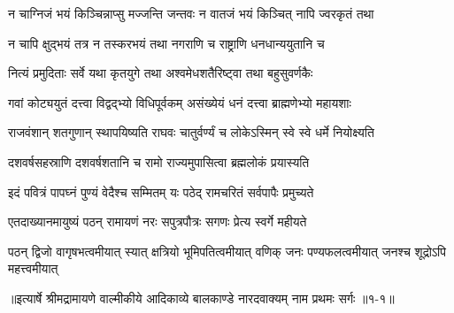 \twolineshloka
{न चाग्निजं भयं किञ्चिन्नाप्सु मज्जन्ति जन्तवः}
{न वातजं भयं किञ्चित् नापि ज्वरकृतं तथा} %

\twolineshloka
{न चापि क्षुद्भयं तत्र न तस्करभयं तथा}
{नगराणि च राष्ट्राणि धनधान्ययुतानि च} %

\twolineshloka
{नित्यं प्रमुदिताः सर्वे यथा कृतयुगे तथा}
{अश्वमेधशतैरिष्ट्वा तथा बहुसुवर्णकैः} %

\twolineshloka
{गवां कोट्ययुतं दत्त्वा विद्वद्भ्यो विधिपूर्वकम्}
{असंख्येयं धनं दत्त्वा ब्राह्मणेभ्यो महायशाः} %

\twolineshloka
{राजवंशान् शतगुणान् स्थापयिष्यति राघवः}
{चातुर्वर्ण्यं च लोकेऽस्मिन् स्वे स्वे धर्मे नियोक्ष्यति} %

\twolineshloka
{दशवर्षसहस्राणि दशवर्षशतानि च}
{रामो राज्यमुपासित्वा ब्रह्मलोकं प्रयास्यति} %

\twolineshloka
{इदं पवित्रं पापघ्नं पुण्यं वेदैश्च सम्मितम्}
{यः पठेद् रामचरितं सर्वपापैः प्रमुच्यते} %

\twolineshloka
{एतदाख्यानमायुष्यं पठन् रामायणं नरः}
{सपुत्रपौत्रः सगणः प्रेत्य स्वर्गे महीयते} %

\fourlineindentedshloka
{पठन् द्विजो वागृषभत्वमीयात्}
{स्यात् क्षत्रियो भूमिपतित्वमीयात्}
{वणिक् जनः पण्यफलत्वमीयात्}
{जनश्च शूद्रोऽपि महत्त्वमीयात्} %


॥इत्यार्षे श्रीमद्रामायणे वाल्मीकीये आदिकाव्ये बालकाण्डे नारदवाक्यम् नाम प्रथमः सर्गः ॥१-१॥
